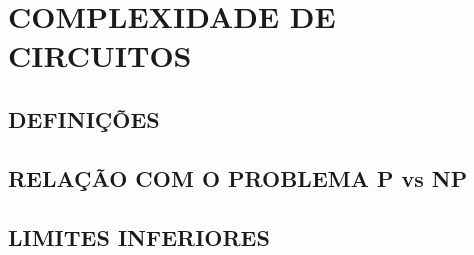 \chapter{COMPLEXIDADE DE CIRCUITOS}

\section{DEFINIÇÕES}

\section{RELAÇÃO COM O PROBLEMA P vs NP}

\section{LIMITES INFERIORES}
